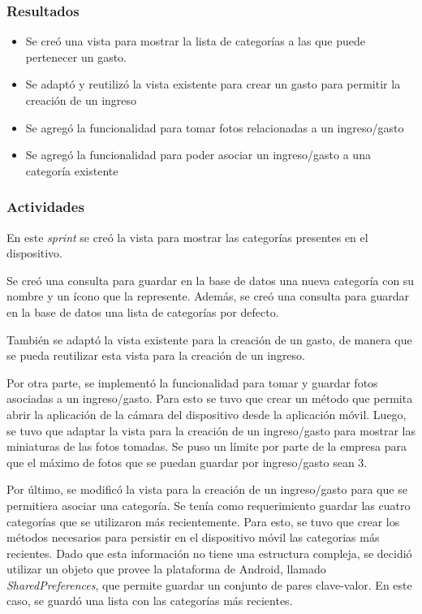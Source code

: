 \subsubsection{Resultados}
\begin{itemize}
\item Se creó una vista para mostrar la lista de categorías a las que puede pertenecer un gasto.
\item Se adaptó y reutilizó la vista existente para crear un gasto para permitir la creación de un ingreso
\item Se agregó la funcionalidad para tomar fotos relacionadas a un ingreso/gasto
\item Se agregó la funcionalidad para poder asociar un ingreso/gasto a una categoría existente

\end{itemize}

\subsubsection{Actividades}

En este \textit{sprint} se creó la vista para mostrar las categorías presentes en el dispositivo.

Se creó una consulta para guardar en la base de datos una nueva categoría con su nombre y un ícono que la represente. Además, se creó una consulta para guardar en la base de datos una lista de categorías por defecto.

También se adaptó la vista existente para la creación de un gasto, de manera que se pueda reutilizar esta vista para la creación de un ingreso. 

Por otra parte, se implementó la funcionalidad para tomar y guardar fotos asociadas a un ingreso/gasto. Para esto se tuvo que crear un método que permita abrir la aplicación de la cámara del dispositivo desde la aplicación móvil. Luego, se tuvo que adaptar la vista para la creación de un ingreso/gasto para mostrar las miniaturas de las fotos tomadas. Se puso un límite por parte de la empresa para que el máximo de fotos que se puedan guardar por ingreso/gasto sean 3.

Por último, se modificó la vista para la creación de un ingreso/gasto para que se permitiera asociar una categoría. Se tenía como requerimiento guardar las cuatro categorías que se utilizaron más recientemente. Para esto, se tuvo que crear los métodos necesarios para persistir en el dispositivo móvil las categorias más recientes. Dado que esta información no tiene una estructura compleja, se decidió utilizar un objeto que provee la plataforma de Android, llamado \textit{SharedPreferences}, que permite guardar un conjunto de pares clave-valor. En este caso, se guardó una lista con las categorías más recientes.

